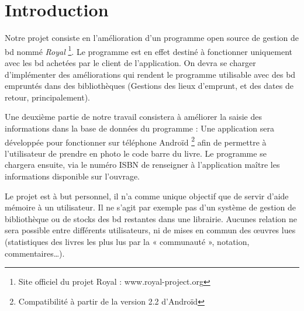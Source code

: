 \part*{Introduction}
Notre projet consiste en l'amélioration d'un programme open source de gestion de bd nommé \emph{Royal}
\footnote{Site officiel du projet Royal : www.royal-project.org}.
Le programme est en effet destiné à fonctionner uniquement avec les bd achetées par le client de l'application.
On devra se charger d'implémenter des améliorations qui rendent le programme utilisable avec des bd empruntés dans des bibliothèques 
(Gestions des lieux d'emprunt, et des dates de retour, principalement).

Une deuxième partie de notre travail consistera à améliorer la saisie des informations dans la base de données du programme : 
Une application sera développée pour fonctionner sur téléphone Androïd 
\footnote{Compatibilité à partir de la version 2.2 d'Androïd}
afin de permettre à l'utilisateur de prendre en photo le code barre du livre.
Le programme se chargera ensuite, via le numéro ISBN de renseigner à l'application maître les informations disponible sur l'ouvrage.

Le projet est à but personnel, il n'a comme unique objectif que de servir d'aide mémoire à un utilisateur.
Il ne s'agit par exemple pas d'un système de gestion de bibliothèque ou de stocks des bd restantes dans une librairie.
Aucunes relation ne sera possible entre différents utilisateurs, ni de mises en commun des œuvres lues
(statistiques des livres les plus lus par la « communauté », notation, commentaires…).
